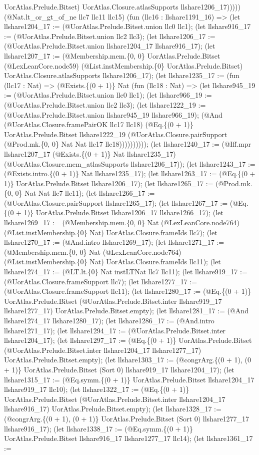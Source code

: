 \documentclass[11pt]{article}
\begin{document}
UorAtlas.Prelude.Bitset) UorAtlas.Closure.atlasSupports llshare1206\_17))))) (@Nat.lt\_or\_gt\_of\_ne llc7 llc11 llc15) (fun (llc16 : llshare1191\_16) => (let llshare1204\_17 := (@UorAtlas.Prelude.Bitset.union llc0 llc1); (let llshare916\_17 := (@UorAtlas.Prelude.Bitset.union llc2 llc3); (let llshare1206\_17 := (@UorAtlas.Prelude.Bitset.union llshare1204\_17 llshare916\_17); (let llshare1207\_17 := (@Membership.mem.\{0, 0\} UorAtlas.Prelude.Bitset (@LexLeanCore.node59) (@List.instMembership.\{0\} UorAtlas.Prelude.Bitset) UorAtlas.Closure.atlasSupports llshare1206\_17); (let llshare1235\_17 := (fun (llc17 : Nat) => (@Exists.\{(0 + 1)\} Nat (fun (llc18 : Nat) => (let llshare945\_19 := (@UorAtlas.Prelude.Bitset.union llc0 llc1); (let llshare966\_19 := (@UorAtlas.Prelude.Bitset.union llc2 llc3); (let llshare1222\_19 := (@UorAtlas.Prelude.Bitset.union llshare945\_19 llshare966\_19); (@And (@UorAtlas.Closure.framePairOK llc17 llc18) (@Eq.\{(0 + 1)\} UorAtlas.Prelude.Bitset llshare1222\_19 (@UorAtlas.Closure.pairSupport (@Prod.mk.\{0, 0\} Nat Nat llc17 llc18)))))))))); (let llshare1240\_17 := (@Iff.mpr llshare1207\_17 (@Exists.\{(0 + 1)\} Nat llshare1235\_17) (@UorAtlas.Closure.mem\_atlasSupports llshare1206\_17)); (let llshare1243\_17 := (@Exists.intro.\{(0 + 1)\} Nat llshare1235\_17); (let llshare1263\_17 := (@Eq.\{(0 + 1)\} UorAtlas.Prelude.Bitset llshare1206\_17); (let llshare1265\_17 := (@Prod.mk.\{0, 0\} Nat Nat llc7 llc11); (let llshare1266\_17 := (@UorAtlas.Closure.pairSupport llshare1265\_17); (let llshare1267\_17 := (@Eq.\{(0 + 1)\} UorAtlas.Prelude.Bitset llshare1206\_17 llshare1266\_17); (let llshare1269\_17 := (@Membership.mem.\{0, 0\} Nat (@LexLeanCore.node764) (@List.instMembership.\{0\} Nat) UorAtlas.Closure.frameIds llc7); (let llshare1270\_17 := (@And.intro llshare1269\_17); (let llshare1271\_17 := (@Membership.mem.\{0, 0\} Nat (@LexLeanCore.node764) (@List.instMembership.\{0\} Nat) UorAtlas.Closure.frameIds llc11); (let llshare1274\_17 := (@LT.lt.\{0\} Nat instLTNat llc7 llc11); (let llshare919\_17 := (@UorAtlas.Closure.frameSupport llc7); (let llshare1277\_17 := (@UorAtlas.Closure.frameSupport llc11); (let llshare1280\_17 := (@Eq.\{(0 + 1)\} UorAtlas.Prelude.Bitset (@UorAtlas.Prelude.Bitset.inter llshare919\_17 llshare1277\_17) UorAtlas.Prelude.Bitset.empty); (let llshare1281\_17 := (@And llshare1274\_17 llshare1280\_17); (let llshare1286\_17 := (@And.intro llshare1271\_17); (let llshare1294\_17 := (@UorAtlas.Prelude.Bitset.inter llshare1204\_17); (let llshare1297\_17 := (@Eq.\{(0 + 1)\} UorAtlas.Prelude.Bitset (@UorAtlas.Prelude.Bitset.inter llshare1204\_17 llshare1277\_17) UorAtlas.Prelude.Bitset.empty); (let llshare1303\_17 := (@congrArg.\{(0 + 1), (0 + 1)\} UorAtlas.Prelude.Bitset (Sort 0) llshare919\_17 llshare1204\_17); (let llshare1315\_17 := (@Eq.symm.\{(0 + 1)\} UorAtlas.Prelude.Bitset llshare1204\_17 llshare919\_17 llc10); (let llshare1322\_17 := (@Eq.\{(0 + 1)\} UorAtlas.Prelude.Bitset (@UorAtlas.Prelude.Bitset.inter llshare1204\_17 llshare916\_17) UorAtlas.Prelude.Bitset.empty); (let llshare1328\_17 := (@congrArg.\{(0 + 1), (0 + 1)\} UorAtlas.Prelude.Bitset (Sort 0) llshare1277\_17 llshare916\_17); (let llshare1338\_17 := (@Eq.symm.\{(0 + 1)\} UorAtlas.Prelude.Bitset llshare916\_17 llshare1277\_17 llc14); (let llshare1361\_17 := 
\end{document}
